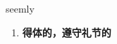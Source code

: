
\begin{frame}
{\huge seemly}
\begin{center}
\begin{enumerate}\Large
  \item \textbf{得体的，遵守礼节的}
\end{enumerate}
\end{center}
\end{frame}
